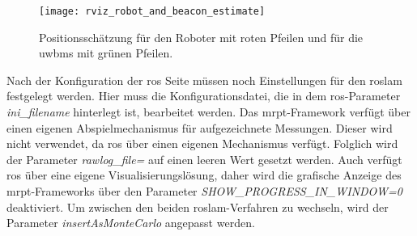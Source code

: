 \begin{figure}[h]
	\centering
	\texttt{[image: rviz\_robot\_and\_beacon\_estimate]}
	\caption{Positionsschätzung für den Roboter mit roten Pfeilen und für die \Glspl{uwbm} mit grünen Pfeilen.}
	\label{fig:rviz_robot_and_beacon_estimate}
\end{figure}

Nach der Konfiguration der \Gls{ros} Seite müssen noch Einstellungen für den \Gls{roslam} festgelegt werden. Hier muss die Konfigurationsdatei, die in dem \Gls{ros}-Parameter \textit{ini\_filename} hinterlegt ist, bearbeitet werden. Das \Gls{mrpt}-Framework verfügt über einen eigenen Abspielmechanismus für aufgezeichnete Messungen. Dieser wird nicht verwendet, da \Gls{ros} über einen eigenen Mechanismus verfügt. Folglich wird der Parameter \textit{rawlog\_file=} auf einen leeren Wert gesetzt werden. Auch verfügt \Gls{ros} über eine eigene Visualisierungslösung, daher wird die grafische Anzeige des \Gls{mrpt}-Frameworks über den Parameter \textit{SHOW\_PROGRESS\_IN\_WINDOW=0} deaktiviert. Um zwischen den beiden \Gls{roslam}-Verfahren zu wechseln, wird der Parameter \textit{insertAsMonteCarlo} angepasst werden.


